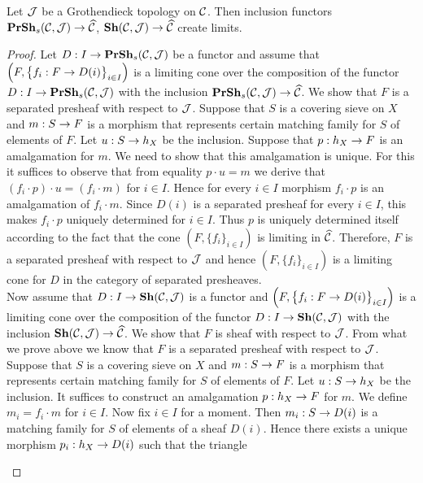 \begin{theorem}\label{theorem:limitsinsheavesandseparatedpresheaves}
Let $\cJ$ be a Grothendieck topology on $\cC$. Then inclusion functors $\PrSh_s(\cC,\cJ)\ra \widehat{\cC}$, $\Sh(\cC,\cJ)\ra \widehat{\cC}$ create limits.
\end{theorem}
\begin{proof}
Let $D:I\ra \PrSh_s(\cC,\cJ)$ be a functor and assume that $\left(F,\big\{f_i:F\ra D(i)\big\}_{i\in I}\right)$ is a limiting cone over the composition of the functor $D:I\ra \PrSh_s(\cC,\cJ)$ with the inclusion $\PrSh_s(\cC,\cJ)\ra \widehat{\cC}$. We show that $F$ is a separated presheaf with respect to $\cJ$. Suppose that $S$ is a covering sieve on $X$ and $m:S\ra F$ is a morphism that represents certain matching family for $S$ of elements of $F$. Let $u:S\ra h_X$ be the inclusion. Suppose that $p:h_X\ra F$ is an amalgamation for $m$. We need to show that this amalgamation is unique. For this it suffices to observe that from equality $p\cdot u = m$ we derive that $(f_i\cdot p)\cdot u = (f_i\cdot m)$ for $i\in I$. Hence for every $i\in I$ morphism $f_i\cdot p$ is an amalgamation of $f_i\cdot m$. Since $D(i)$ is a separated presheaf for every $i\in I$, this makes $f_i\cdot p$ uniquely determined for $i\in I$. Thus $p$ is uniquely determined itself according to the fact that the cone $\left(F,\big\{f_i\big\}_{i\in I}\right)$ is limiting in $\widehat{\cC}$. Therefore, $F$ is a separated presheaf with respect to $\cJ$ and hence $\left(F,\big\{f_i\big\}_{i\in I}\right)$ is a limiting cone for $D$ in the category of separated presheaves.\\
Now assume that $D:I\ra \Sh(\cC,\cJ)$ is a functor and $\left(F,\big\{f_i:F\ra D(i)\big\}_{i\in I}\right)$ is a limiting cone over the composition of the functor $D:I\ra \Sh(\cC,\cJ)$ with the inclusion $\Sh(\cC,\cJ)\ra \widehat{\cC}$. We show that $F$ is sheaf with respect to $\cJ$. From what we prove above we know that $F$ is a separated presheaf with respect to $\cJ$. Suppose that $S$ is a covering sieve on $X$ and $m:S\ra F$ is a morphism that represents certain matching family for $S$ of elements of $F$. Let $u:S\ra h_X$ be the inclusion. It suffices to construct an amalgamation $p:h_X\ra F$ for $m$. We define $m_i = f_i \cdot m$ for $i\in I$. Now fix $i\in I$ for a moment. Then $m_i:S\ra D(i)$ is a matching family for $S$ of elements of a sheaf $D(i)$. Hence there exists a unique morphism $p_i:h_X\ra D(i)$ such that the triangle
\begin{center}
\begin{tikzpicture}

\end{tikzpicture}
\end{center}
\end{proof}
